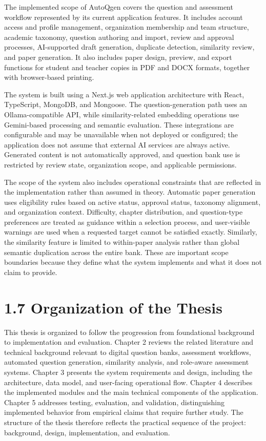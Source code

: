 The implemented scope of AutoQgen covers the question and assessment workflow represented by its current application features. It includes account access and profile management, organization membership and team structure, academic taxonomy, question authoring and import, review and approval processes, AI-supported draft generation, duplicate detection, similarity review, and paper generation. It also includes paper design, preview, and export functions for student and teacher copies in PDF and DOCX formats, together with browser-based printing.

The system is built using a Next.js web application architecture with React, TypeScript, MongoDB, and Mongoose. The question-generation path uses an Ollama-compatible API, while similarity-related embedding operations use Gemini-based processing and semantic evaluation. These integrations are configurable and may be unavailable when not deployed or configured; the application does not assume that external AI services are always active. Generated content is not automatically approved, and question bank use is restricted by review state, organization scope, and applicable permissions.

The scope of the system also includes operational constraints that are reflected in the implementation rather than assumed in theory. Automatic paper generation uses eligibility rules based on active status, approval status, taxonomy alignment, and organization context. Difficulty, chapter distribution, and question-type preferences are treated as guidance within a selection process, and user-visible warnings are used when a requested target cannot be satisfied exactly. Similarly, the similarity feature is limited to within-paper analysis rather than global semantic duplication across the entire bank. These are important scope boundaries because they define what the system implements and what it does not claim to provide.

\section{1.7 Organization of the Thesis}

This thesis is organized to follow the progression from foundational background to implementation and evaluation. Chapter 2 reviews the related literature and technical background relevant to digital question banks, assessment workflows, automated question generation, similarity analysis, and role-aware assessment systems. Chapter 3 presents the system requirements and design, including the architecture, data model, and user-facing operational flow. Chapter 4 describes the implemented modules and the main technical components of the application. Chapter 5 addresses testing, evaluation, and validation, distinguishing implemented behavior from empirical claims that require further study. The structure of the thesis therefore reflects the practical sequence of the project: background, design, implementation, and evaluation.

